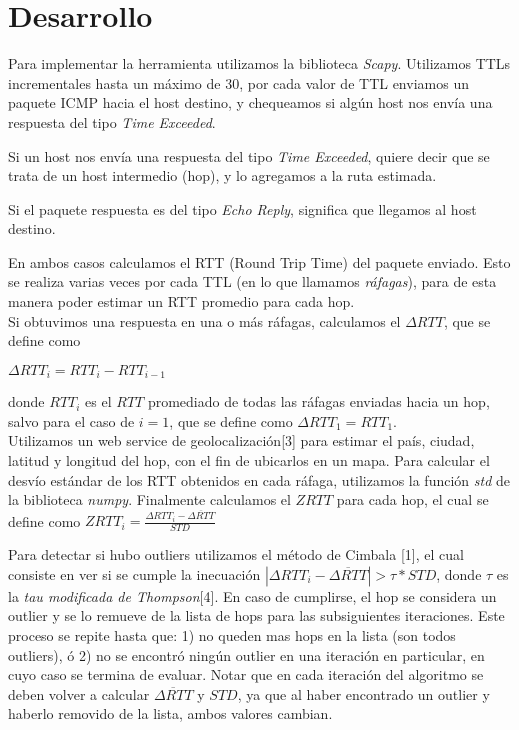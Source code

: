 \section{Desarrollo}

Para implementar la herramienta utilizamos la biblioteca \textit{Scapy}. Utilizamos TTLs incrementales hasta un máximo de 30, por cada valor de TTL enviamos un paquete ICMP hacia el host destino, y chequeamos si algún host nos envía una respuesta del tipo \textit{Time Exceeded}. 

Si un host nos envía una respuesta del tipo \textit{Time Exceeded}, quiere decir que se trata de un host intermedio (hop), y lo agregamos a la ruta estimada.

Si el paquete respuesta es del tipo \textit{Echo Reply}, significa que llegamos al host destino.

En ambos casos calculamos el RTT (Round Trip Time) del paquete enviado. Esto se realiza varias veces por cada TTL (en lo que llamamos \textit{ráfagas}), para de esta manera poder estimar un RTT promedio para cada hop.\\

Si obtuvimos una respuesta en una o más ráfagas, calculamos el $\Delta RTT$, que se define como
\begin{center}
$\Delta RTT_{i} = RTT_{i} - RTT_{i-1}$
\end{center}
donde $RTT_{i}$ es el $RTT$ promediado de todas las ráfagas enviadas hacia un hop, salvo para el caso de 
$i = 1$, que se define como $\Delta RTT_{1} = RTT_{1}$.\\

Utilizamos un web service de geolocalización[3] para estimar el país, ciudad, latitud y longitud del hop, con el fin de ubicarlos en un mapa. Para calcular el desvío estándar de los RTT obtenidos en cada ráfaga, utilizamos la función \textit{std} de la biblioteca \textit{numpy}.
Finalmente calculamos el $ZRTT$ para cada hop, el cual se define como $ZRTT_{i} = \frac{\Delta RTT_{i} - \overline{\Delta RTT}}{STD}$

Para detectar si hubo outliers utilizamos el método de Cimbala [1], el cual consiste en ver si se cumple la inecuación $|\Delta RTT_{i} - \overline{\Delta RTT}| > \tau * STD$, donde $\tau$ es la \textit{tau modificada de Thompson}[4]. En caso de cumplirse, el hop se considera un outlier y se lo remueve de la lista de hops para las subsiguientes iteraciones. Este proceso se repite hasta que: 1) no queden mas hops en la lista (son todos outliers), ó 2) no se encontró ningún outlier en una iteración en particular, en cuyo caso se termina de evaluar. Notar que en cada iteración del algoritmo se deben volver a calcular $\overline{\Delta RTT}$ y $STD$, ya que al haber encontrado un outlier y haberlo removido de la lista, ambos valores cambian.

